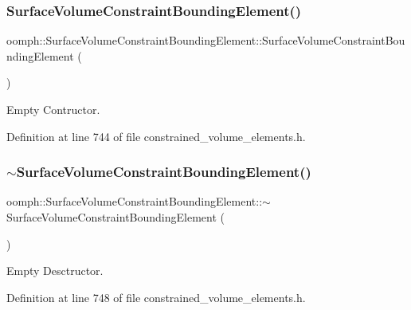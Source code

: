 \subsubsection{\texorpdfstring{Surface\+Volume\+Constraint\+Bounding\+Element()}{SurfaceVolumeConstraintBoundingElement()}}
{\footnotesize\ttfamily oomph\+::\+Surface\+Volume\+Constraint\+Bounding\+Element\+::\+Surface\+Volume\+Constraint\+Bounding\+Element (\begin{DoxyParamCaption}{ }\end{DoxyParamCaption})\hspace{0.3cm}{\ttfamily [inline]}}



Empty Contructor. 



Definition at line 744 of file constrained\+\_\+volume\+\_\+elements.\+h.

\mbox{\label{classoomph_1_1SurfaceVolumeConstraintBoundingElement_a9545195abf877c791208081022f30672}} 
\subsubsection{\texorpdfstring{$\sim$\+Surface\+Volume\+Constraint\+Bounding\+Element()}{~SurfaceVolumeConstraintBoundingElement()}}
{\footnotesize\ttfamily oomph\+::\+Surface\+Volume\+Constraint\+Bounding\+Element\+::$\sim$\+Surface\+Volume\+Constraint\+Bounding\+Element (\begin{DoxyParamCaption}{ }\end{DoxyParamCaption})\hspace{0.3cm}{\ttfamily [inline]}}



Empty Desctructor. 



Definition at line 748 of file constrained\+\_\+volume\+\_\+elements.\+h.



